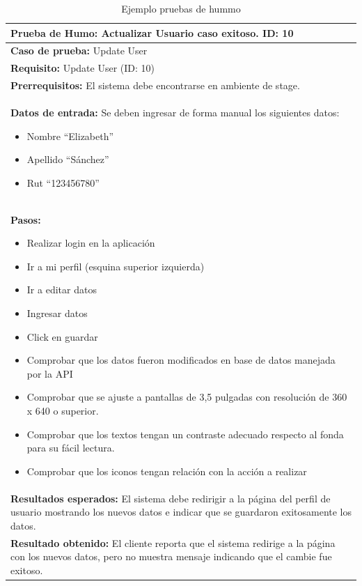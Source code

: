 \begin{table}[H]
    \caption[Ejemplo pruebas de hummo] {Ejemplo pruebas de hummo}
    \label{tbl:ejemplo pruebas de humo}
    \begin{tabular}{|p{}|}
        \hline
        \textbf{Prueba de Humo: Actualizar Usuario caso exitoso. \hfill ID: 10} \\
    	\hline
    	\hline
    	\textbf{Caso de prueba:} Update User\\ \hline
    	\textbf{Requisito:} Update User (ID: 10)\\ \hline
    	\textbf{Prerrequisitos:} El sistema debe encontrarse en ambiente de stage.\\ \hline
		\textbf{Datos de entrada:} Se deben ingresar de forma manual los siguientes datos:
		\begin{itemize}
			\item Nombre “Elizabeth”
			\item Apellido “Sánchez”
			\item Rut “123456780”
		\end{itemize} \\ \hline
		\textbf{Pasos:} 
		\begin{itemize}
			\item Realizar login en la aplicación
			\item Ir a mi perfil (esquina superior izquierda) 
			\item Ir a editar datos
			\item Ingresar datos
			\item Click en guardar
			\item Comprobar que los datos fueron modificados en base de datos manejada por la API
			\item Comprobar que se ajuste a pantallas de 3,5 pulgadas con resolución de 360 x 640 o superior.
			\item Comprobar que los textos tengan un contraste adecuado respecto al fonda para su fácil lectura. 
			\item Comprobar que los iconos tengan relación con la acción a realizar
		\end{itemize}\\ \hline
		\textbf{Resultados esperados:} El sistema debe redirigir a la página del perfil de usuario mostrando los nuevos datos e indicar que se guardaron exitosamente los datos. \\ \hline
		\textbf{Resultado obtenido:} El cliente reporta que el sistema redirige a la página con los nuevos datos, pero no muestra mensaje indicando que el cambie fue exitoso.\\ \hline
    \end{tabular}
\end{table}

